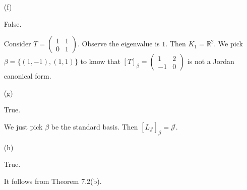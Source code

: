 \begin{Exercise}
\begin{enumerate}[(a)]
\item[(f)]
\begin{answer}
False.
\end{answer}
\begin{solution}
Consider $T = \begin{pmatrix}
1 & 1 \\
0 & 1
\end{pmatrix}$. Observe the eigenvalue is $1$. Then $K_1 = \mathbb{R}^2$. We pick $\beta = \{(1,-1),(1,1)\}$ to know that $[T]_{\beta} = \begin{pmatrix}
1 & 2 \\
-1 & 0
\end{pmatrix}$ is not a Jordan canonical form.
\end{solution}

\item[(g)]
\begin{answer}
True.
\end{answer}
\begin{solution}
We just pick $\beta$ be the standard basis. Then $[L_\mathcal{J}]_{\beta} = \mathcal{J}$.
\end{solution}

\item[(h)]
\begin{answer}
True.
\end{answer}
\begin{solution}
It follows from Theorem 7.2(b).
\end{solution}

\end{enumerate}
\end{Exercise}